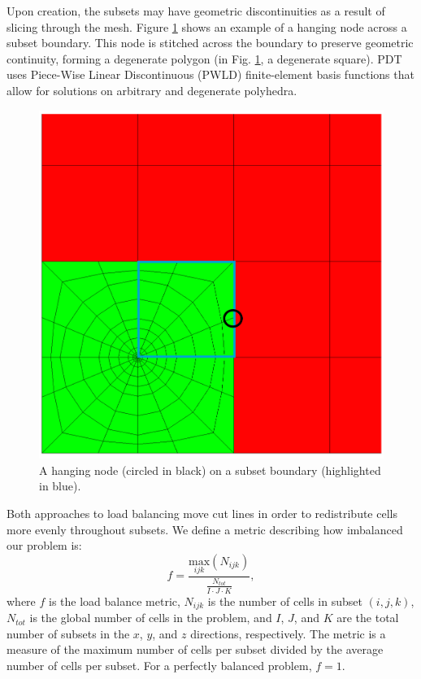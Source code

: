 Upon creation, the subsets may have geometric discontinuities as a result of slicing through the mesh.
Figure \ref{hanging_node} shows an example of a hanging node across a subset boundary.
This node is stitched across the boundary to preserve geometric continuity, forming a degenerate polygon \cite{degenerate} (in Fig. \ref{hanging_node}, a degenerate square).
PDT uses Piece-Wise Linear Discontinuous (PWLD) finite-element basis functions \cite{pwld_ragusa,pwld_teresa} that allow for solutions on arbitrary and degenerate polyhedra.
\begin{figure}[H]
  \centering
  \includegraphics[scale=0.2]{../../figures/hanging_node_spiderweb_example.png}
   \caption{A hanging node (circled in black) on a subset boundary (highlighted in blue).}
   \label{hanging_node}
\end{figure}

Both approaches to load balancing move cut lines in order to redistribute cells more evenly throughout subsets. We define a metric describing how imbalanced our problem is:
\begin{equation}
f =\frac{\underset{ijk}{\text{max}}(N_{ijk})}{\frac{N_{tot}}{I\cdot J\cdot K}},
\label{metric_def}
\end{equation}
where $f$ is the load balance metric, $N_{ijk}$ is the number of cells in subset $(i,j,k)$, $N_{tot}$ is the global number of cells in the problem, and $I$, $J$, and $K$ are the total number of subsets in the $x$, $y$, and $z$ directions, respectively. The metric is a measure of the maximum number of cells per subset divided by the average number of cells per subset. For a perfectly balanced problem, $f = 1$.

